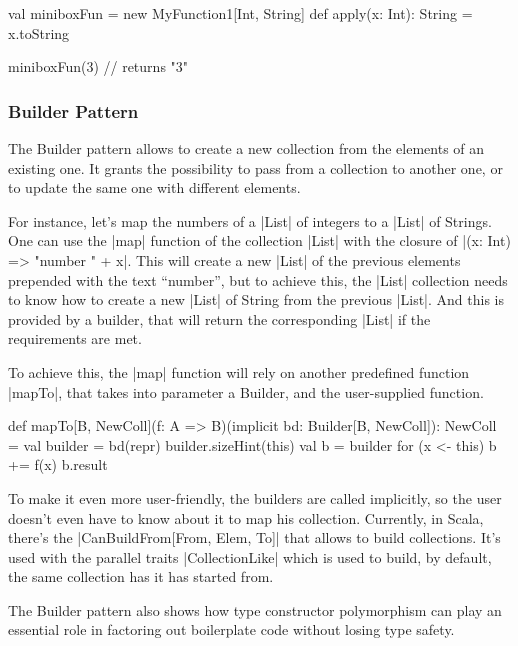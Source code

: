 \begin{lstlisting-nobreak}
 val miniboxFun = new MyFunction1[Int, String] {
   def apply(x: Int): String = x.toString
 }
 
 miniboxFun(3)    // returns "3"
\end{lstlisting-nobreak}

\subsubsection{Builder Pattern}

The Builder pattern allows to create a new collection from the elements of an existing one. It grants the possibility to pass from a collection to another one, or to update the same one with different elements.


For instance, let's map the numbers of a |List| of integers to a |List| of Strings. One can use the |map| function of the collection |List| with the closure of |(x: Int) => "number " + x|. This will create a new |List| of the previous elements prepended with the text ``number'', but to achieve this, the |List| collection needs to know how to create a new |List| of String from the previous |List|. And this is provided by a builder, that will return the corresponding |List| if the requirements are met.

To achieve this, the |map| function will rely on another predefined function |mapTo|, that takes into parameter a Builder, and the user-supplied function.

\begin{lstlisting-nobreak}
 def mapTo[B, NewColl](f: A => B)(implicit bd: Builder[B, NewColl]): NewColl = {
   val builder = bd(repr)
   builder.sizeHint(this)
   val b = builder
   for (x <- this) b += f(x)
   b.result
 }
\end{lstlisting-nobreak}

To make it even more user-friendly, the builders are called implicitly, so the user doesn't even have to know about it to map his collection. Currently, in Scala, there's the |CanBuildFrom[From, Elem, To]| that allows to build collections. It's used with the parallel traits |CollectionLike| which is used to build, by default, the same collection has it has started from.

The Builder pattern also shows how type constructor polymorphism can play an essential role in factoring out boilerplate code without losing type safety.\cite{adriaan}

